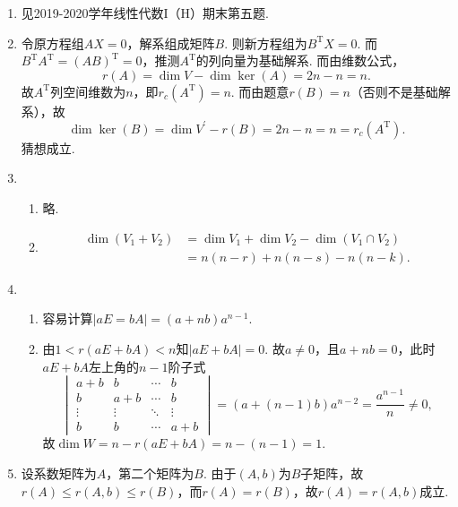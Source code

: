 \begin{enumerate}
    \item 见2019-2020学年线性代数I（H）期末第五题.

    \item 令原方程组$AX=0$，解系组成矩阵$B$. 则新方程组为$B^\mathrm{T}X=0$. 而$B^\mathrm{T}A^\mathrm{T}=(AB)^\mathrm{T}=0$，推测$A^\mathrm{T}$的列向量为基础解系. 而由维数公式，
          \[ r(A)=\dim V-\dim\ker(A) = 2n-n=n. \]
          故$A^\mathrm{T}$列空间维数为$n$，即$r_c(A^\mathrm{T})=n$. 而由题意$r(B)=n$（否则不是基础解系），故
          \[ \dim{\ker(B)}=\dim{V^{\prime}}-r(B)=2n-n=n=r_c(A^\mathrm{T}). \]
          猜想成立.

    \item \begin{enumerate}
              \item 略.

              \item \begin{align*}
                        \dim(V_1+V_2) & =\dim V_1+\dim V_2-\dim(V_1\cap V_2) \\
                                      & =n(n-r)+n(n-s)-n(n-k).
                    \end{align*}
          \end{enumerate}

    \item \begin{enumerate}
              \item 容易计算$|aE=bA|=(a+nb)a^{n-1}$.

              \item 由$1<r(aE+bA)<n$知$|aE+bA|=0$. 故$a\neq 0$，且$a+nb=0$，此时$aE+bA$左上角的$n-1$阶子式
                    \[ \begin{vmatrix}
                            a+b    & b      & \cdots & b      \\
                            b      & a+b    & \cdots & b      \\
                            \vdots & \vdots & \ddots & \vdots \\
                            b      & b      & \cdots & a+b
                        \end{vmatrix}=(a+(n-1)b)a^{n-2}=\frac{a^{n-1}}{n}\neq 0, \]
                    故$\dim{W}=n-r(aE+bA)=n-(n-1)=1$.
          \end{enumerate}

    \item 设系数矩阵为$A$，第二个矩阵为$B$. 由于$(A,b)$为$B$子矩阵，故$r(A)\leqslant r(A,b)\leqslant r(B)$，而$r(A)=r(B)$，故$r(A)=r(A,b)$成立.


\end{enumerate}
